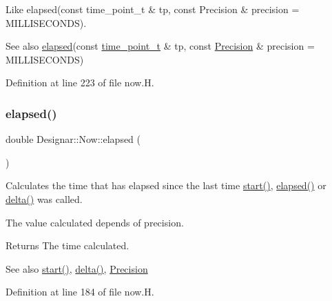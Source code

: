 Like elapsed(const time\+\_\+point\+\_\+t \& tp, const Precision \& precision = M\+I\+L\+L\+I\+S\+E\+C\+O\+N\+DS).

\begin{DoxySeeAlso}{See also}
\hyperlink{class_designar_1_1_now_a3219d85172fc9628ef90f66c1d69a8e0}{elapsed}(const \hyperlink{namespace_designar_a0edbd598eadb672df2c70e5af4dfccee}{time\+\_\+point\+\_\+t} \& tp, const \hyperlink{class_designar_1_1_now_a3c9f5e57907c88cbe63c70a64638c072}{Precision} \& precision = M\+I\+L\+L\+I\+S\+E\+C\+O\+N\+DS) 
\end{DoxySeeAlso}


Definition at line 223 of file now.\+H.

\mbox{\label{class_designar_1_1_now_a3219d85172fc9628ef90f66c1d69a8e0}} 
\subsubsection{\texorpdfstring{elapsed()}{elapsed()}\hspace{0.1cm}{\footnotesize\ttfamily [1/2]}}
{\footnotesize\ttfamily double Designar\+::\+Now\+::elapsed (\begin{DoxyParamCaption}{ }\end{DoxyParamCaption})\hspace{0.3cm}{\ttfamily [inline]}}

Calculates the time that has elapsed since the last time \hyperlink{class_designar_1_1_now_a7ccb419799b46b7786b9ad0ac231de14}{start()}, \hyperlink{class_designar_1_1_now_a3219d85172fc9628ef90f66c1d69a8e0}{elapsed()} or \hyperlink{class_designar_1_1_now_ae2a46a7ff8392fbadc9fb28ee17f7f5a}{delta()} was called.

The value calculated depends of precision.

\begin{DoxyReturn}{Returns}
The time calculated. 
\end{DoxyReturn}
\begin{DoxySeeAlso}{See also}
\hyperlink{class_designar_1_1_now_a7ccb419799b46b7786b9ad0ac231de14}{start()}, \hyperlink{class_designar_1_1_now_ae2a46a7ff8392fbadc9fb28ee17f7f5a}{delta()}, \hyperlink{class_designar_1_1_now_a3c9f5e57907c88cbe63c70a64638c072}{Precision} 
\end{DoxySeeAlso}


Definition at line 184 of file now.\+H.

